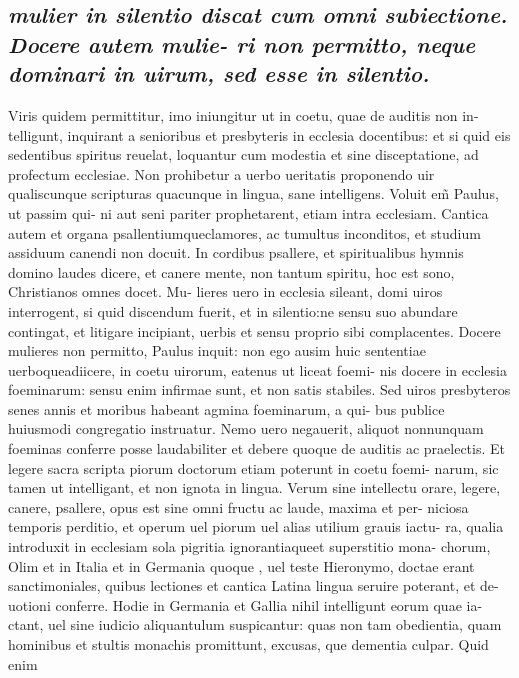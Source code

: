 \documentclass{article}
\begin{document}
\begin{pages}
\subsection*{\textit{mulier in silentio discat cum omni subiectione. Docere autem mulie- ri non permitto, neque  dominari in uirum, sed esse in silentio. }}\pstart Viris quidem permittitur, imo iniungitur ut in coetu, quae de auditis non in- telligunt, inquirant a senioribus et presbyteris in ecclesia docentibus: et si quid eis sedentibus spiritus reuelat, loquantur cum modestia et sine disceptatione, ad profectum ecclesiae. Non prohibetur a uerbo ueritatis proponendo uir qualiscunque  scripturas quacunque  in lingua, sane intelligens. Voluit em̃ Paulus, ut passim qui- ni aut seni pariter prophetarent, etiam intra ecclesiam. Cantica autem et organa psallentiumqueclamores, ac tumultus inconditos, et studium assiduum canendi non docuit. In cordibus psallere, et spiritualibus hymnis domino laudes dicere, et canere mente, non tantum spiritu, hoc est sono, Christianos omnes docet. Mu- lieres uero in ecclesia sileant, domi uiros interrogent, si quid discendum fuerit, et in silentio:ne sensu suo abundare contingat, et litigare incipiant, uerbis et sensu proprio sibi complacentes. Docere mulieres non permitto, Paulus inquit: non ego ausim huic sententiae uerboqueadiicere, in coetu uirorum, eatenus ut liceat foemi- nis docere in ecclesia foeminarum: sensu enim infirmae sunt, et non satis stabiles. Sed uiros presbyteros senes annis et moribus habeant agmina foeminarum, a qui- bus publice huiusmodi congregatio instruatur. Nemo uero negauerit, aliquot nonnunquam foeminas conferre posse laudabiliter et debere quoque  de auditis ac praelectis. Et legere sacra scripta piorum doctorum etiam poterunt in coetu foemi- narum, sic tamen ut intelligant, et non ignota in lingua. Verum sine intellectu orare, legere, canere, psallere, opus est sine omni fructu ac laude, maxima et per- niciosa temporis perditio, et operum uel piorum uel alias utilium grauis iactu- ra, qualia introduxit in ecclesiam sola pigritia ignorantiaqueet superstitio mona- chorum, Olim et in Italia et in Germania quoque , uel teste Hieronymo, doctae erant sanctimoniales, quibus lectiones et cantica Latina lingua seruire poterant, et de- uotioni conferre. Hodie in Germania et Gallia nihil intelligunt eorum quae ia- ctant, uel sine iudicio aliquantulum suspicantur: quas non tam obedientia, quam hominibus et stultis monachis promittunt, excusas, que  dementia culpar. Quid enim  \pend

\end{pages}
\end{document}
